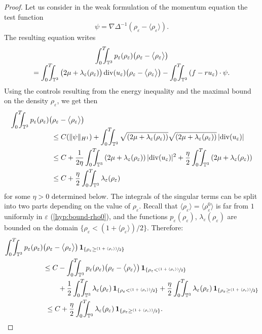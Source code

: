 \documentclass[JEP,XML,SOM,Unicode,NoEqCountersInSection]{cedram}
\newcommand{\<}{\bigl\langle}
\renewcommand{\>}{\bigr\rangle}
\newcommand{\psfrac}[2]{\sfrac{(#1)}{#2}}
\newcommand{\intTTT}{\int_0^T\hspace*{-2.5mm}\int_{\TT}}
\theoremstyle{definition}
\theoremstyle{remark}
\newcommand{\TT}{\mathbb{T}^3}
\DeclareMathOperator{\Div}{div}
\let\ep\varepsilon
\begin{document}
\begin{proof} 
Let us consider in the weak formulation of the momentum equation the test function
\[
\psi = \nabla \Delta^{-1}(\rho_{\ep} - \<\rho_{\ep}\>).
\]
The resulting equation writes
\begin{multline*}
\intTTT{p_{\ep}(\rho_{\ep}) \big(\rho_{\ep} - \<\rho_{\ep}\>\big) } \\[-5pt]
= \intTTT{\big(2\mu+ \lambda_{\ep}(\rho_{\ep})\big)\Div(u_{\ep}) \big(\rho_{\ep} - \<\rho_{\ep}\>\big) }
- \intTTT{(f-ru_\ep) \cdot \psi}.
\end{multline*} 
Using the controls resulting from the energy inequality and the maximal bound on the density $\rho_\ep$, we get then
\begin{align*}
\intTTT p_{\ep}(\rho_{\ep}) &\big(\rho_{\ep} - \<\rho_{\ep}\>\big)\\[-5pt]
& ~ \leq C(\|\psi\|_{H^1}) + \intTTT{\sqrt{(2\mu+\lambda_{\ep}(\rho_{\ep}))} \sqrt{(2\mu+\lambda_{\ep}(\rho_{\ep}))}\,|{\Div(u_{\ep})}| } \\
& ~ \leq C + \dfrac{1}{2\eta}\intTTT{(2\mu+\lambda_{\ep}(\rho_{\ep}))\,|{\Div(u_{\ep})}|^2}
+ \dfrac{\eta}{2} \intTTT{(2\mu +\lambda_{\ep}(\rho_{\ep}))} \\
& ~ \leq C + \dfrac{\eta}{2}\intTTT{\lambda_{\ep}(\rho_{\ep})}
\end{align*}
for some $\eta>0$ determined below.
The integrals of the singular terms can be split into two parts depending on the value of $\rho_\ep$.
Recall that $\<\rho_\ep\> = \<\rho_\ep^0\>$ is far from $1$ uniformly in $\ep$ (\cf \eqref{hyp:bound-rho0}), and the functions $p_\ep(\rho_\ep)$, $\lambda_{\ep}(\rho_\ep)$ are bounded on the domain $ \{ \rho_{\ep} < {(1+\<\rho_{\ep}\>)}/{2}\}$.
Therefore:
\begin{align*}
\intTTT p_{\ep}(\rho_{\ep})& \big(\rho_{\ep} - \<\rho_{\ep}\>\big) \,\mathbf{1}_{\{ \rho_{\ep} \geq \psfrac{1+\langle\rho_{\ep}\rangle}{2} \} } \\
&\leq C - \intTTT{p_{\ep}(\rho_{\ep}) \big(\rho_{\ep} - \<\rho_{\ep}\>\big) \,\mathbf{1}_{\{ \rho_{\ep} < \psfrac{1+\langle\rho_{\ep}\rangle}{2} \} } }\\
&\hspace*{.75cm} + \dfrac{1}{2}\intTTT{\lambda_{\ep}(\rho_{\ep}) \,\mathbf{1}_{\{ \rho_{\ep} < \psfrac{1+\langle\rho_{\ep}\rangle}{2}\} } } + \dfrac{\eta}{2}\intTTT{\lambda_{\ep}(\rho_{\ep}) \,\mathbf{1}_{\{ \rho_{\ep} \geq \psfrac{1+\langle\rho_{\ep}\rangle}{2}\} } } \\
& ~ \leq C + \dfrac{\eta}{2}\intTTT{\lambda_{\ep}(\rho_{\ep}) \,\mathbf{1}_{\{ \rho_{\ep} \geq \psfrac{1+\langle\rho_{\ep}\rangle}{2}\} } }.

\end{align*}
\end{proof}
\end{document}
